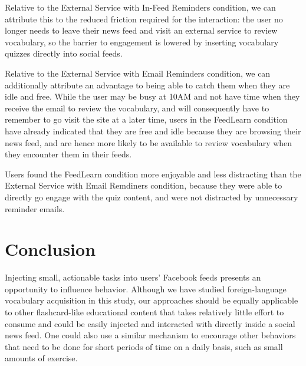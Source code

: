 \documentclass{chi-ext}
\begin{document}
Relative to the External Service with In-Feed Reminders condition, we can attribute this to the reduced friction required for the interaction: the user no longer needs to leave their news feed and visit an external service to review vocabulary, so the barrier to engagement is lowered by inserting vocabulary quizzes directly into social feeds.

Relative to the External Service with Email Reminders condition, we can additionally attribute an advantage to being able to catch them when they are idle and free. While the user may be busy at 10AM and not have time when they receive the email to review the vocabulary, and will consequently have to remember to go visit the site at a later time, users in the FeedLearn condition have already indicated that they are free and idle because they are browsing their news feed, and are hence more likely to be available to review vocabulary when they encounter them in their feeds.

Users found the FeedLearn condition more enjoyable and less distracting than the External Service with Email Remdiners condition, because they were able to directly go engage with the quiz content, and were not distracted by unnecessary reminder emails.

\section{Conclusion}

Injecting small, actionable tasks into users' Facebook feeds presents an opportunity to influence behavior. Although we have studied foreign-language vocabulary acquisition in this study, our approaches should be equally applicable to other flashcard-like educational content that takes relatively little effort to consume and could be easily injected and interacted with directly inside a social news feed. One could also use a similar mechanism to encourage other behaviors that need to be done for short periods of time on a daily basis, such as small amounts of exercise.



\end{document}
